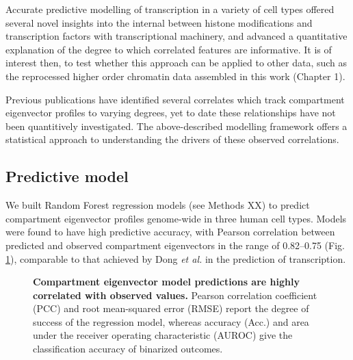 \documentclass[a4paper,11pt,oneside]{book}
\begin{document}
Accurate predictive modelling of transcription in a variety of cell types offered several novel insights into the internal between histone modifications and transcription factors with transcriptional machinery, and advanced a quantitative explanation of the degree to which correlated features are informative. It is of interest then, to test whether this approach can be applied to other data, such as the reprocessed higher order chromatin data assembled in this work (Chapter 1).

Previous publications have identified several correlates which track compartment eigenvector profiles to varying degrees,\cite{Lieberman2009, Imakaev2012} yet to date these relationships have not been quantitively investigated. The above-described modelling framework offers a statistical approach to understanding the drivers of these observed correlations.

\subsection{Predictive model}

We built Random Forest regression models (see Methods XX) to predict compartment eigenvector profiles genome-wide in three human cell types. Models were found to have high predictive accuracy, with Pearson correlation between predicted and observed compartment eigenvectors in the range of 0.82--0.75 (Fig. \ref{fig:modelres}), comparable to that achieved by Dong \emph{et al.}\cite{Dong2012} in the prediction of transcription.

\begin{figure}
\begin{center} 
\captionsetup{width=\textwidth} 
\caption{ {\bf Compartment eigenvector model predictions are highly correlated with observed values.}  Pearson correlation coefficient (PCC) and root mean-squared error (RMSE) report the degree of success of the regression model, whereas accuracy (Acc.) and area under the receiver operating characteristic (AUROC) give the classification accuracy of binarized outcomes.
}\label{fig:modelres}
\end{center} 
\end{figure} 
\end{document}
